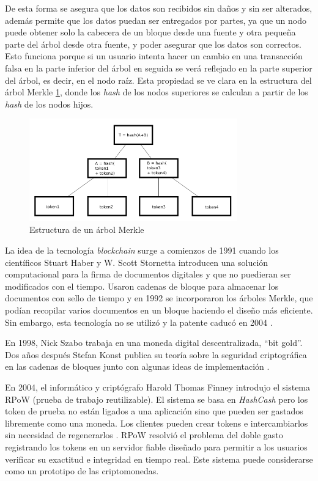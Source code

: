 De esta forma se asegura que los datos son recibidos sin daños y sin ser alterados, además permite que los datos puedan ser entregados por partes, ya que un nodo puede obtener solo la cabecera de un bloque desde una fuente y otra pequeña parte del árbol desde otra fuente, y poder asegurar que los datos son correctos. Esto funciona porque si un usuario intenta hacer un cambio en una transacción falsa en la parte inferior del árbol en seguida se verá reflejado en la parte superior del árbol, es decir, en el nodo raíz. Esta propiedad se ve clara en la estructura del árbol Merkle \ref{fig:arbol-Merkle}, donde los \textit{hash} de los nodos superiores se calculan a partir de los \textit{hash} de los nodos hijos.\\

\begin{figure}[h]
	\centering
	\includegraphics[width=0.8\textwidth]{figuras/arbol_merkle.png}
	\caption{Estructura de un árbol Merkle \cite{img-arbol-merkle}}
	\label{fig:arbol-Merkle}
\end{figure}

La idea de la tecnología \textit{blockchain} surge a comienzos de 1991 cuando los científicos Stuart Haber y W. Scott Stornetta introducen una solución computacional para la firma de documentos digitales y que no puedieran ser modificados con el tiempo. Usaron cadenas de bloque para almacenar los documentos con sello de tiempo y en 1992 se incorporaron los árboles Merkle, que podían recopilar varios documentos en un bloque haciendo el diseño más eficiente. Sin embargo, esta tecnología no se utilizó y la patente caducó en 2004 \cite{historia1-block}.

En 1998, Nick Szabo trabaja en una moneda digital descentralizada, ``bit gold''. Dos años después Stefan Konst publica su teoría sobre la seguridad criptográfica en las cadenas de bloques junto con algunas ideas de implementación \cite{historia2-block}.

En 2004, el informático y criptógrafo Harold Thomas Finney introdujo el sistema RPoW (prueba de trabajo reutilizable). El sistema se basa en \textit{HashCash} pero los token de prueba no están ligados a una aplicación sino que pueden ser gastados libremente como una moneda. Los clientes pueden crear tokens e intercambiarlos sin necesidad de regenerarlos \cite{RPoW}. RPoW resolvió el problema del doble gasto registrando los tokens en un servidor fiable diseñado para permitir a los usuarios verificar su exactitud e integridad en tiempo real. Este sistema puede considerarse como un prototipo de las criptomonedas.

